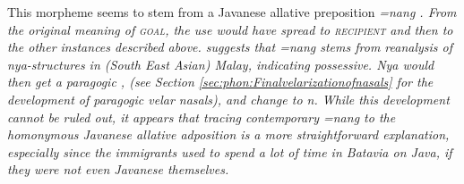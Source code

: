  
This morpheme seems to stem from a Javanese allative preposition \em =nang \em \citep[151]{Slomanson2006cll}. From the original meaning of \textsc{goal}, the use would have spread to \textsc{recipient} and then to the other instances described above. \citet{Ansaldo2005santiago} suggests that \em =nang \em stems from reanalysis of \em nya\em-structures in (South East Asian) Malay, indicating possessive. \em Nya \em would then get a paragogic \ng{}, (see Section \ref{sec:phon:Finalvelarizationofnasals} for the development of paragogic velar nasals), and change \ny{} to n. While this development cannot be ruled out, it appears that tracing contemporary \em =nang \em to the homonymous Javanese allative adposition is a more straightforward explanation, especially since the immigrants used to spend a lot of time in Batavia on Java, if they were not even Javanese themselves.




